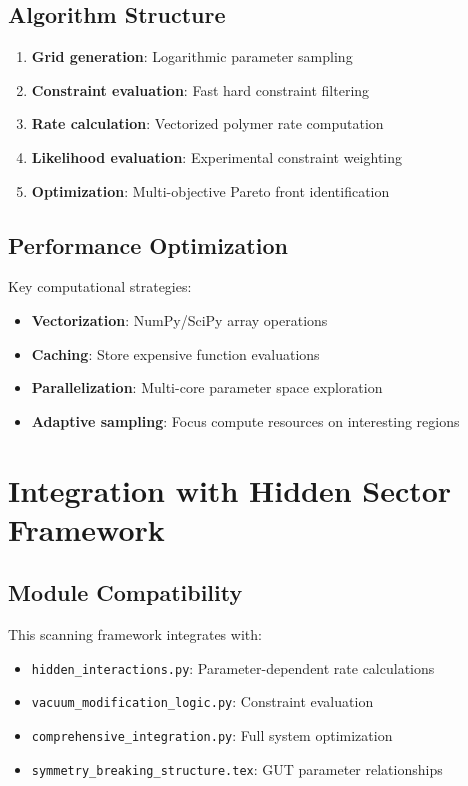 \documentclass[11pt]{article}
\begin{document}
\subsection{Algorithm Structure}

\begin{enumerate}
    \item \textbf{Grid generation}: Logarithmic parameter sampling
    \item \textbf{Constraint evaluation}: Fast hard constraint filtering
    \item \textbf{Rate calculation}: Vectorized polymer rate computation
    \item \textbf{Likelihood evaluation}: Experimental constraint weighting
    \item \textbf{Optimization}: Multi-objective Pareto front identification
\end{enumerate}

\subsection{Performance Optimization}

Key computational strategies:
\begin{itemize}
    \item \textbf{Vectorization}: NumPy/SciPy array operations
    \item \textbf{Caching}: Store expensive function evaluations
    \item \textbf{Parallelization}: Multi-core parameter space exploration
    \item \textbf{Adaptive sampling}: Focus compute resources on interesting regions
\end{itemize}

\section{Integration with Hidden Sector Framework}

\subsection{Module Compatibility}

This scanning framework integrates with:
\begin{itemize}
    \item \texttt{hidden\_interactions.py}: Parameter-dependent rate calculations
    \item \texttt{vacuum\_modification\_logic.py}: Constraint evaluation
    \item \texttt{comprehensive\_integration.py}: Full system optimization
    \item \texttt{symmetry\_breaking\_structure.tex}: GUT parameter relationships
\end{itemize}
\end{document}
